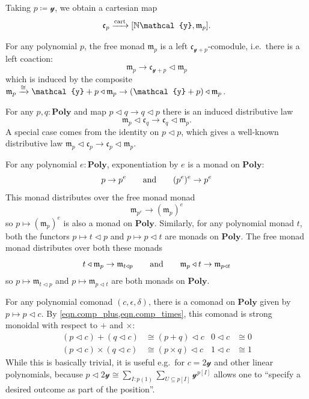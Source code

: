 \documentclass[11pt, one side, article]{memoir}
\theoremstyle{definition}
\theoremstyle{plain}
\renewcommand{\ss}{\subseteq}
\newcommand{\Cat}[1]{\mathbf{#1}}%
\newcommand{\To}[2][]{\xrightarrow[#1]{\tn{$#2$}}}
\newcommand{\tn}[1]{\textnormal{#1}}
\newcommand{\nn}{\mathbb{N}}
\newcommand{\yon}{{\mathcal{y}}}
\newcommand{\poly}{\Cat{Poly}}
\newcommand{\cart}{\tn{cart}}
\newcommand{\tocart}{\To{\cart}}
\newcommand{\0}{\textsf{0}}
\newcommand{\1}{\tn{\textsf{1}}}
\newcommand{\tri}{\mathbin{\triangleleft}}
\newcommand{\cofree}{\mathfrak{c}}
\newcommand{\free}{\mathfrak{m}}
\newcommand{\hh}[2][]{#1 \tn{#2} #1}
\newcommand{\qqand}{\hh[\qquad]{and}}
\begin{document}
Taking $p\coloneqq\yon$, we obtain a cartesian map
\begin{equation}
	\cofree_p\tocart[\nn\yon,\free_p].
\end{equation}

For any polynomial $p$, the free monad $\free_p$ is a left $\cofree_{\yon+p}$-comodule, i.e.\ there is a left coaction:
\begin{equation}
	\free_p\to\cofree_{\yon+p}\tri\free_p
\end{equation}
which is induced by the composite $\free_p\To{\cong}\yon+p\tri\free_p\to(\yon+p)\tri\free_p$. 

For any $p,q:\poly$ and map $p\tri q\to q\tri p$ there is an induced distributive law
\begin{equation}
  \free_p\tri\cofree_q\to\cofree_q\tri\free_p.
\end{equation}
A special case comes from the identity on $p\tri p$, which gives a well-known distributive law $\free_p\tri\cofree_p\to\cofree_p\tri\free_p$.

For any polynomial $e:\poly$, exponentiation by $e$ is a monad on $\poly$:
\begin{equation}
	p\to p^e
	\qqand
	(p^e)^e\to p^e
\end{equation}
This monad distributes over the free monad monad
\begin{equation}
	\free_{p^e}\to(\free_p)^e
\end{equation}
so $p\mapsto(\free_p)^e$ is also a monad on $\poly$. Similarly, for any polynomial monad $t$, both the functors $p\mapsto t\tri p$ and $p\mapsto p\tri t$ are monads on $\poly$. The free monad monad distributes over both these monads
\begin{equation}
	t\tri\free_p\to\free_{t\tri p}
	\qqand
	\free_p\tri t\to\free_{p\tri t}
\end{equation}
so $p\mapsto \free_{t\tri p}$ and $p\mapsto \free_{p\tri t}$ are both monads on $\poly$.


For any polynomial comonad $(c,\epsilon,\delta)$, there is a comonad on $\poly$ given by $p\mapsto p\tri c$. By \cref{eqn.comp_plus,eqn.comp_times}, this comonad is strong monoidal with respect to $+$ and $\times$:
\begin{align}
	(p\tri c)+(q\tri c)&\cong (p+q)\tri c&0\tri c&\cong0\\
	(p\tri c)\times(q\tri c)&\cong (p\times q)\tri c&1\tri c&\cong1	
\end{align}
While this is basically trivial, it is useful e.g.\ for $c=2\yon$ and other linear polynomials, because $p\tri 2\yon\cong\sum_{I:p(1)}\sum_{U\ss p[I]}\yon^{p[I]}$ allows one to ``specify a desired outcome as part of the position''.
\end{document}
